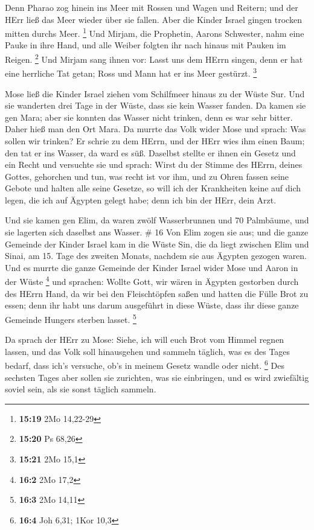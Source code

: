  Denn Pharao zog hinein ins Meer mit Rossen und Wagen und
Reitern; und der HErr ließ das Meer wieder über sie fallen. Aber die
Kinder Israel gingen trocken mitten durchs Meer. \footnote{\textbf{15:19}
  2Mo 14,22-29}  Und Mirjam, die Prophetin, Aarons
Schwester, nahm eine Pauke in ihre Hand, und alle Weiber folgten ihr
nach hinaus mit Pauken im Reigen. \footnote{\textbf{15:20} Ps 68,26}
 Und Mirjam sang ihnen vor: Lasst uns dem HErrn singen,
denn er hat eine herrliche Tat getan; Ross und Mann hat er ins Meer
gestürzt. \footnote{\textbf{15:21} 2Mo 15,1}

 Mose ließ die Kinder Israel ziehen vom Schilfmeer hinaus
zu der Wüste Sur. Und sie wanderten drei Tage in der Wüste, dass sie
kein Wasser fanden.  Da kamen sie gen Mara; aber sie
konnten das Wasser nicht trinken, denn es war sehr bitter. Daher hieß
man den Ort Mara.  Da murrte das Volk wider Mose und
sprach: Was sollen wir trinken?  Er schrie zu dem HErrn,
und der HErr wies ihm einen Baum; den tat er ins Wasser, da ward es süß.
Daselbst stellte er ihnen ein Gesetz und ein Recht und versuchte sie
 und sprach: Wirst du der Stimme des HErrn, deines Gottes,
gehorchen und tun, was recht ist vor ihm, und zu Ohren fassen seine
Gebote und halten alle seine Gesetze, so will ich der Krankheiten keine
auf dich legen, die ich auf Ägypten gelegt habe; denn ich bin der HErr,
dein Arzt.

 Und sie kamen gen Elim, da waren zwölf Wasserbrunnen und
70 Palmbäume, und sie lagerten sich daselbst ans Wasser. \# 16
 Von Elim zogen sie aus; und die ganze Gemeinde der Kinder
Israel kam in die Wüste Sin, die da liegt zwischen Elim und Sinai, am
15. Tage des zweiten Monats, nachdem sie aus Ägypten gezogen waren.
 Und es murrte die ganze Gemeinde der Kinder Israel wider
Mose und Aaron in der Wüste \footnote{\textbf{16:2} 2Mo 17,2}
 und sprachen: Wollte Gott, wir wären in Ägypten gestorben
durch des HErrn Hand, da wir bei den Fleischtöpfen saßen und hatten die
Fülle Brot zu essen; denn ihr habt uns darum ausgeführt in diese Wüste,
dass ihr diese ganze Gemeinde Hungers sterben lasset. \footnote{\textbf{16:3}
  2Mo 14,11}

 Da sprach der HErr zu Mose: Siehe, ich will euch Brot vom
Himmel regnen lassen, und das Volk soll hinausgehen und sammeln täglich,
was es des Tages bedarf, dass ich's versuche, ob's in meinem Gesetz
wandle oder nicht. \footnote{\textbf{16:4} Joh 6,31; 1Kor 10,3}
 Des sechsten Tages aber sollen sie zurichten, was sie
einbringen, und es wird zwiefältig soviel sein, als sie sonst täglich
sammeln.

